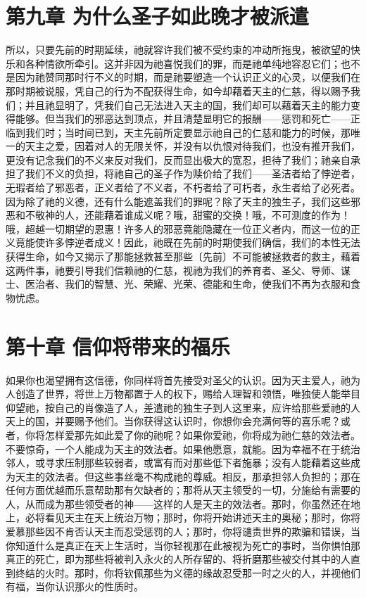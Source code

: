 
\section{第九章 为什么圣子如此晚才被派遣}

所以，只要先前的时期延续，祂就容许我们被不受约束的冲动所拖曳，被欲望的快乐和各种情欲所牵引。这并非因为祂喜悦我们的罪，而是祂单纯地容忍它们；也不是因为祂赞同那时行不义的时期，而是祂要塑造一个认识正义的心灵，以便我们在那时期被说服，凭自己的行为不配获得生命，如今却藉着天主的仁慈，得以赐予我们；并且祂显明了，凭我们自己无法进入天主的国，我们却可以藉着天主的能力变得能够。但当我们的邪恶达到顶点，并且清楚显明它的报酬——惩罚和死亡——正临到我们时；当时间已到，天主先前所定要显示祂自己的仁慈和能力的时候，那唯一的天主之爱，因着对人的无限关怀，并没有以仇恨对待我们，也没有推开我们，更没有记念我们的不义来反对我们，反而显出极大的宽忍，担待了我们；祂亲自承担了我们不义的负担，将祂自己的圣子作为赎价给了我们——圣洁者给了悖逆者，无瑕者给了邪恶者，正义者给了不义者，不朽者给了可朽者，永生者给了必死者。因为除了祂的义德，还有什么能遮盖我们的罪呢？除了天主的独生子，我们这些邪恶和不敬神的人，还能藉着谁成义呢？哦，甜蜜的交换！哦，不可测度的作为！哦，超越一切期望的恩惠！许多人的邪恶竟能隐藏在一位正义者内，而这一位的正义竟能使许多悖逆者成义！因此，祂既在先前的时期使我们确信，我们的本性无法获得生命，如今又揭示了那能拯救甚至那些〔先前〕不可能被拯救者的救主，藉着这两件事，祂要引导我们信赖祂的仁慈，视祂为我们的养育者、圣父、导师、谋士、医治者、我们的智慧、光、荣耀、光荣、德能和生命，使我们不再为衣服和食物忧虑。\par


\section{第十章  信仰将带来的福乐}

如果你也渴望拥有这信德，你同样将首先接受对圣父的认识。因为天主爱人，祂为人创造了世界，将世上万物都置于人的权下，赐给人理智和领悟，唯独使人能举目仰望祂，按自己的肖像造了人，差遣祂的独生子到人这里来，应许给那些爱祂的人天上的国，并要赐予他们。当你获得这认识时，你想你会充满何等的喜乐呢？或者，你将怎样爱那先如此爱了你的祂呢？如果你爱祂，你将成为祂仁慈的效法者。不要惊奇，一个人能成为天主的效法者。如果他愿意，就能。因为幸福不在于统治邻人，或寻求压制那些较弱者，或富有而对那些低下者施暴；没有人能藉着这些成为天主的效法者。但这些事丝毫不构成祂的尊威。相反，那承担邻人负担的；那在任何方面优越而乐意帮助那有欠缺者的；那将从天主领受的一切，分施给有需要的人，从而成为那些领受者的神——这样的人是天主的效法者。那时，你虽然还在地上，必将看见天主在天上统治万物；那时，你将开始讲述天主的奥秘；那时，你将爱慕那些因不肯否认天主而忍受惩罚的人；那时，你将谴责世界的欺骗和错误，当你知道什么是真正在天上生活时，当你轻视那在此被视为死亡的事时，当你惧怕那真正的死亡，即为那些将被判入永火的人所存留的、将折磨那些被交付其中的人直到终结的火时。那时，你将钦佩那些为义德的缘故忍受那一时之火的人，并视他们有福，当你认识那火的性质时。\par

